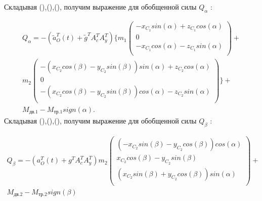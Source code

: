 Складывая (),(),(), получим выражение для обобщенной силы  \( Q_{ \alpha } \) :\par


\begin{equation} %
\label{eq:p3:40}
\begin{multlined}
Q_{ \alpha }=- \left( \tilde{a}_{O}^{T} \left( t \right) +\tilde{g}^{T}A_{c}^{T}A_{y}^{T} \right)  
\{   
	m_{1} \left( 
	\begin{array}{c}
		-x_{C_{1}}sin \left(  \alpha  \right) +z_{C_{1}}cos \left(  \alpha  \right)\\
		0\\
		-x_{C_{1}}cos \left(  \alpha  \right) -z_{C_{1}}sin \left(  \alpha  \right) \\
	\end{array}
	\right) + \\
	m_{2} \left( 
	\begin{array}{c}
		- \left( x_{C_{2}}cos \left(  \beta  \right) -y_{C_{2}}sin \left(  \beta  \right)  \right) sin \left(  \alpha  \right) +z_{C_{2}}cos \left(  \alpha  \right)\\
		0\\
		- \left( x_{C_{2}}cos \left(  \beta  \right) -y_{C_{2}}sin \left(  \beta  \right)  \right) cos \left(  \alpha  \right) -z_{C_{2}}sin \left(  \alpha  \right)\\
	\end{array}
	\right)  
\} 
+ \\
M_{\textit{дв.1}}-
M_{\textit{тр.1}}sign \left(  \alpha  \right) .
\end{multlined}
\end{equation}
Складывая (),(),(), получим выражение для обобщенной силы  \( Q_{ \beta } \) :\par


\begin{equation} %
\label{eq:p3:41}
\begin{multlined}
Q_{ \beta }=- \left( a_{O}^{T} \left( t \right) +g^{T}A_{c}^{T}A_{y}^{T} \right) m_{2} \left( \begin{matrix}
\left( -x_{C_{2}}sin \left(  \beta  \right) -y_{C_{2}}cos \left(  \beta  \right)  \right) cos \left(  \alpha  \right) \\
x_{C_{2}}cos \left(  \beta  \right) -y_{C_{2}}sin \left(  \beta  \right) \\
\left( x_{C_{2}}sin \left(  \beta  \right) +y_{C_{2}}cos \left(  \beta  \right)  \right) sin \left(  \alpha  \right) \\
\end{matrix}
\right) + \\
M_{\textit{дв.2}}-M_{\textit{тр.2}}sign \left(  \beta  \right) 
\end{multlined}
\end{equation}

